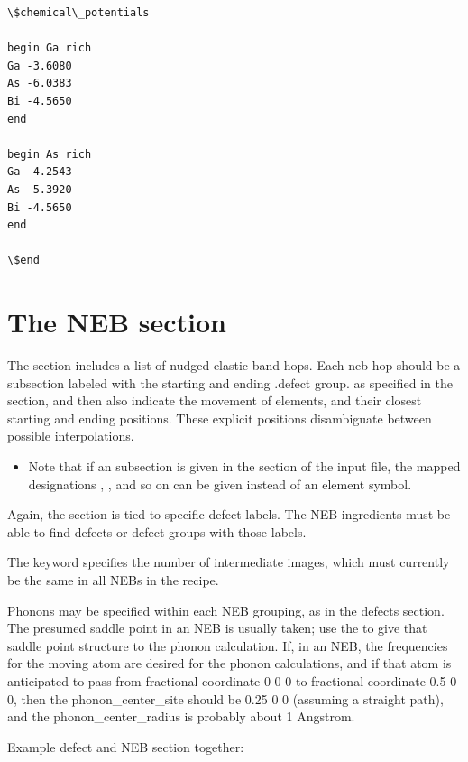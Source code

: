 \documentclass[letterpaper,10pt,english]{sphinxmanual}
\begin{document}
\begin{Verbatim}[commandchars=\\\{\}]
\$chemical\_potentials

begin Ga rich
Ga -3.6080
As -6.0383
Bi -4.5650
end

begin As rich
Ga -4.2543
As -5.3920
Bi -4.5650
end

\$end
\end{Verbatim}


\section{The NEB section}
\label{3_0_inputfile:the-neb-section}
The  section includes a list of nudged-elastic-band hops. Each neb hop should be a subsection labeled with the starting and ending .defect group. as specified in the  section, and then also indicate the movement of elements, and their closest starting and ending positions. These explicit positions disambiguate between possible interpolations.
\begin{itemize}
\item {} 
Note that if an  subsection is given in the  section of the input file, the mapped designations , , and so on can be given instead of an element symbol.

\end{itemize}

Again, the  section is tied to specific defect labels. The NEB ingredients must be able to find defects or defect groups with those labels.

The  keyword specifies the number of intermediate images, which must currently be the same in all NEBs in the recipe.

Phonons may be specified within each NEB grouping, as in the defects section. The presumed saddle point in an NEB is usually taken; use the  to give that saddle point structure to the phonon calculation. If, in an NEB, the frequencies for the moving atom are desired for the phonon calculations, and if that atom is anticipated to pass from fractional coordinate 0 0 0 to fractional coordinate 0.5 0 0, then the phonon\_center\_site should be 0.25 0 0 (assuming a straight path), and the phonon\_center\_radius is probably about 1 Angstrom.

Example defect and NEB section together:
\end{document}
